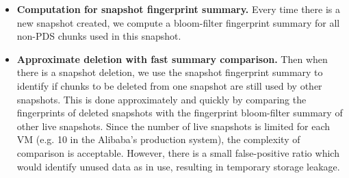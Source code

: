 \begin{itemize}
\item {\bf Computation for snapshot fingerprint summary.}
Every time there is a new snapshot created,
we compute a bloom-filter fingerprint summary for all non-PDS chunks used 
in this snapshot.

\item {\bf Approximate deletion with fast summary comparison.}
Then when there is a snapshot deletion, 
we use  the snapshot fingerprint summary to identify if  chunks to be deleted from one snapshot
are still used by other snapshots. 
This is done approximately and quickly by comparing the fingerprints of deleted snapshots with
the fingerprint bloom-filter summary of other live snapshots.
Since the number of live snapshots is limited for each VM (e.g. 10 in the Alibaba's production system), 
the complexity of comparison is acceptable.
However, there is a small false-positive ratio which
would identify unused data as in use, resulting in temporary storage leakage.


\end{itemize}
